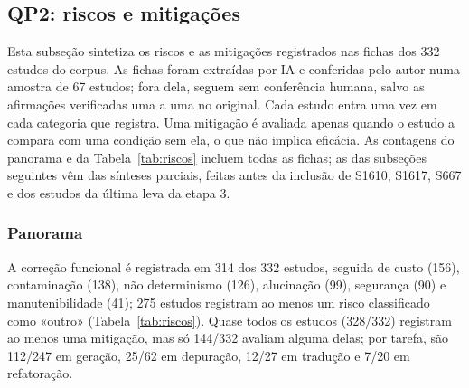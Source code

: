 \subsection{QP2: riscos e mitigações}\label{sec:qp2}

Esta subseção sintetiza os riscos e as mitigações registrados nas fichas dos 332 estudos do corpus. As fichas foram extraídas por IA e conferidas pelo autor numa amostra de 67 estudos; fora dela, seguem sem conferência humana, salvo as afirmações verificadas uma a uma no original. Cada estudo entra uma vez em cada categoria que registra. Uma mitigação é avaliada apenas quando o estudo a compara com uma condição sem ela, o que não implica eficácia. As contagens do panorama e da Tabela~\ref{tab:riscos} incluem todas as fichas; as
das subseções seguintes vêm das sínteses parciais, feitas antes da inclusão de S1610, S1617, S667 e dos estudos da última leva da etapa 3.

\subsubsection{Panorama}

A correção funcional é registrada em 314 dos 332 estudos, seguida de custo (156), contaminação (138), não determinismo (126), alucinação (99), segurança (90) e manutenibilidade (41); 275 estudos registram ao menos um risco classificado como «outro» (Tabela~\ref{tab:riscos}).
Quase todos os estudos (328/332) registram ao menos uma mitigação, mas só 144/332 avaliam alguma delas; por tarefa, são 112/247 em geração, 25/62 em depuração, 12/27 em tradução e 7/20 em refatoração.

